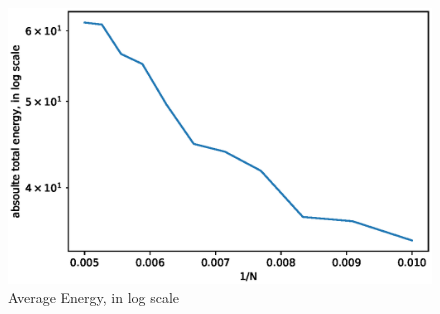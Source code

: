 \documentclass[UTF8,a4paper]{article}
\begin{document}
\begin{figure}[H]
\begin{minipage}[t]{0.6\textwidth}
		\centering
		\includegraphics[height=0.2\textheight]{fig/sc_exp2_loge.eps}
		\caption{Average Energy, in log scale}
	\end{minipage}
\end{figure}
\end{document}
